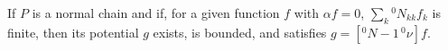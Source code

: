 If $P$ is a normal chain and if, for a given function $f$ with $\alpha f = 0$, $\sum_k {}^0N_{kk} f_k$ is finite, then its potential $g$ exists, is bounded, and satisfies $g = [{}^0N - 1\,{}^0\nu]f$.
